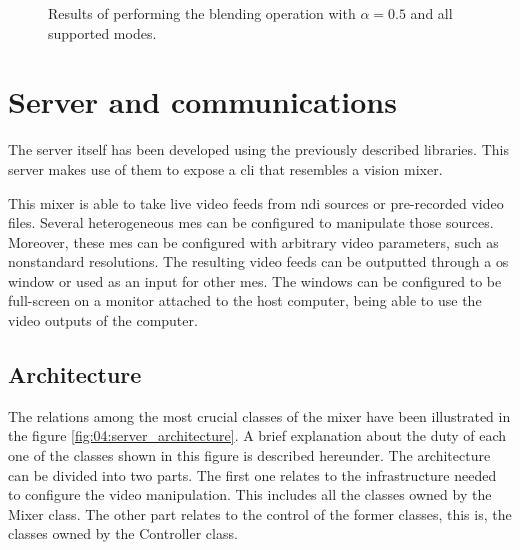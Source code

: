 \documentclass[../main.tex]{subfiles}
\begin{document}
\begin{figure}[htbp]
    \centering

    \caption{Results of performing the blending operation with $\alpha=0.5$ and all supported modes.}
    \label{fig:04:blending_modes}
\end{figure}



\section{Server and communications}
The server itself has been developed using the previously described libraries. This server makes use of them to expose a \gls{cli} that resembles a vision mixer.\newline

This mixer is able to take live video feeds from \gls{ndi} sources or pre-recorded video files. Several heterogeneous \glspl{me} can be configured to manipulate those sources. Moreover, these \glspl{me} can be configured with arbitrary video parameters, such as nonstandard resolutions. The resulting video feeds can be outputted through a \gls{os} window or used as an input for other \glspl{me}. The windows can be configured to be full-screen on a monitor attached to the host computer, being able to use the video outputs of the computer.\newline

\subsection{Architecture}
The relations among the most crucial classes of the mixer have been illustrated in the figure \ref{fig:04:server_architecture}. A brief explanation about the duty of each one of the classes shown in this figure is described hereunder. The architecture can be divided into two parts. The first one relates to the infrastructure needed to configure the video manipulation. This includes all the classes owned by the Mixer class. The other part relates to the control of the former classes, this is, the classes owned by the Controller class.\newline
\end{document}
